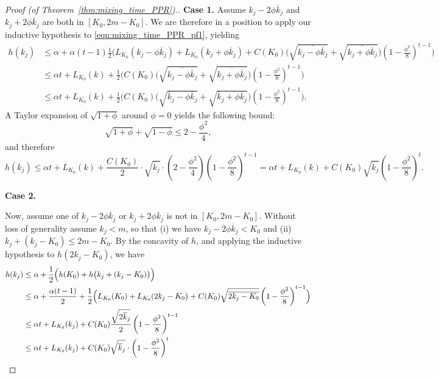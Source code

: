 \documentclass[11pt,twoside]{article}
\newcommand{\1}{\mathbf{1}}
\begin{document}
\begin{proof}[Proof (of Theorem~\ref{thm:mixing_time_PPR}).]
	\textbf{Case 1.}
	Assume $k_j - 2 \phi \overline{k}_j$ and $k_j + 2 \phi \overline{k}_j$ are both in $[K_0,2m  - K_0]$. We are therefore in a position to apply our inductive hypothesis to \eqref{eqn:mixing_time_PPR_pf1}, yielding
	\begin{align*}
	h(k_j) & \leq \alpha + \alpha(t-1) \frac{1}{2}\biggl(L_{K_0}(k_j - \phi \overline{k}_j) + L_{K_0}(k_j + \phi \overline{k}_j) + C(K_0)\bigl(\sqrt{\overline{k_j - \phi \overline{k}_j}} + \sqrt{\overline{k_j + \phi \overline{k}_j}}\bigr)\left(1 - \frac{\phi^2}{8}\right)^{t-1} \biggr) \\
	& \leq \alpha t + L_{K_0}(k) + \frac{1}{2}\biggl(C(K_0)\bigl(\sqrt{\overline{k_j - \phi \overline{k}_j}} + \sqrt{\overline{k_j + \phi \overline{k}_j}}\bigr)\left(1 - \frac{\phi^2}{8}\right)^{t-1} \biggr) \\
	& \leq \alpha t + L_{K_0}(k) + \frac{1}{2}\biggl(C(K_0)\bigl(\sqrt{\overline{k}_j - \phi \overline{k}_j} + \sqrt{\overline{k}_j + \phi \overline{k}_j}\bigr)\left(1 - \frac{\phi^2}{8}\right)^{t-1} \biggr).
	\end{align*}
	A Taylor expansion of $\sqrt{1 + \phi}$ around $\phi = 0$ yields the following bound:
	\begin{equation*}
	\sqrt{1 + \phi} + \sqrt{1 - \phi} \leq 2 - \frac{\phi^2}{4},
	\end{equation*}
	and therefore
	\begin{equation*}
	h(k_j) \leq  \alpha t + L_{K_0}(k) + \frac{C(K_0)}{2}\cdot \sqrt{\overline{k}_j}\cdot\left(2 - \frac{\phi^2}{4}\right)\left(1 - \frac{\phi^2}{8}\right)^{t-1} = \alpha t + L_{K_0}(k) + C(K_0)\sqrt{\overline{k}_j}\left(1 - \frac{\phi^2}{8}\right)^{t}.
	\end{equation*}
	
	\textbf{Case 2.}
	
	Now, assume one of $k_j - 2 \phi \overline{k}_j$ or $k_j + 2 \phi \overline{k}_j$ is not in $[K_0,2m  - K_0]$. Without loss of generality assume $k_j < m$, so that (i) we have $k_j - 2 \phi \overline{k}_j < K_0$ and (ii) $k_j + (k_j - K_0) \leq 2m - K_0$. By the concavity of $h$, and applying the inductive hypothesis to $h(2k_j - K_0)$, we have
	\begin{align*}
	h(k_j) & \leq \alpha + \frac{1}{2}\Bigl(h(K_0) + h\bigl(k_j + (k_j - K_0)\bigr)\Bigr) \\
	& \leq\alpha + \frac{\alpha(t - 1)}{2} + \frac{1}{2}\Bigl(L_{K_0}(K_0) + L_{K_0}(2k_j - K_0\bigr) + C(K_0)\sqrt{\overline{2k_j - K_0}}\left(1 - \frac{\phi^2}{8}\right)^{t - 1}\Bigr) \\
	& \leq \alpha t + L_{K_0}(k_j) + C(K_0) \frac{\sqrt{2\overline{k}_j}}{2} \left(1 - \frac{\phi^2}{8}\right)^{t - 1} \\
	& \leq \alpha t + L_{K_0}(k_j) + C(K_0) \sqrt{\overline{k}_j} \cdot \left(1 - \frac{\phi^2}{8}\right)^{t}
	\end{align*}
\end{proof}
\end{document}
